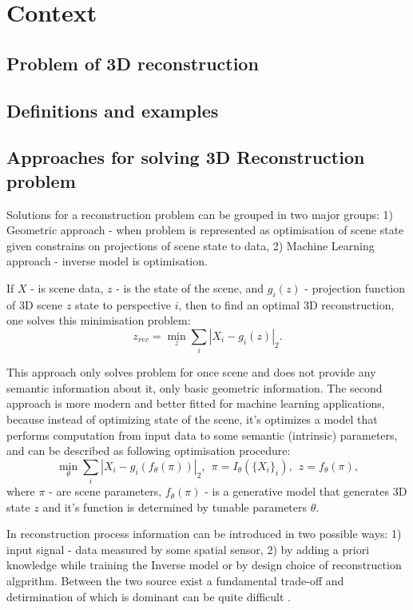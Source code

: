 \section{Context}
\subsection{Problem of 3D reconstruction}

\subsection{Definitions and examples}

\subsection{Approaches for solving 3D Reconstruction problem}

Solutions for a reconstruction problem can be grouped in two major groups: 1) Geometric approach - when problem is represented as optimisation of scene state given constrains on projections of scene state to data, 2) Machine Learning approach - inverse model is optimisation.

If $X$ - is scene data, $z$ - is the state of the scene, and $g_i(z)$ - projection function of 3D scene $z$ state to perspective $i$, then to find an optimal 3D reconstruction, one solves this minimisation problem:
\begin{equation}
z_{rec} = \min_z\sum_i|X_i-g_i(z)|_2 .
\end{equation}

This approach only solves problem for once scene and does not provide any semantic information about it, only basic geometric information. 
The second approach is more modern and better fitted for machine learning applications, because instead of optimizing state of the scene, it's optimizes a model that performs computation from input data to some semantic (intrinsic) parameters, and can be described as following optimisation procedure:
\begin{equation}
\min_\theta\sum_i|X_i-g_i(f_\theta(\pi))|_2,\ \ \pi=I_\theta(\{X_i\}_i),\ \ z=f_\theta(\pi),
\end{equation}
where $\pi$ - are scene parameters, $f_\theta(\pi)$ - is a generative model that generates 3D state $z$ and it's function is determined by tunable parameters $\theta$.

In reconstruction process information can be introduced in two possible ways: 1) input signal - data measured by some spatial sensor, 2) by adding a priori knowledge while training the Inverse model or by design choice of reconstruction algprithm. Between the two source exist a fundamental trade-off and detirmination of which is dominant can be quite difficult \cite{tatarchenko2019single}.

